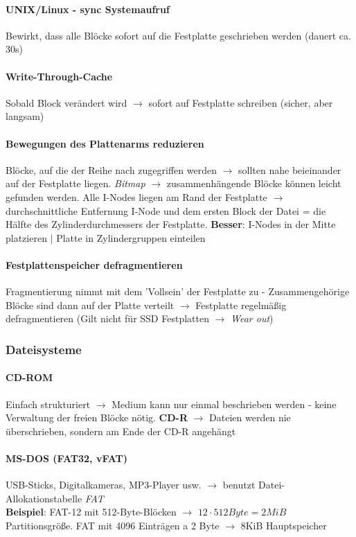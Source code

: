 \documentclass[11pt,a4paper,landscape]{article}
\begin{document}
\begin{multicols*}{3}
	\paragraph{UNIX/Linux - sync Systemaufruf} Bewirkt, dass alle Blöcke sofort auf die Festplatte geschrieben werden (dauert ca. 30s)
	\paragraph{Write-Through-Cache} Sobald Block verändert wird $\rightarrow$ sofort auf Festplatte schreiben (sicher, aber langsam)
	\paragraph{Bewegungen des Plattenarms reduzieren} Blöcke, auf die der Reihe nach zugegriffen werden $\rightarrow$ sollten nahe beieinander auf der Festplatte liegen. \textit{Bitmap} $\rightarrow$ zusammenhängende Blöcke können leicht gefunden werden. Alle I-Nodes liegen am Rand der Festplatte $\rightarrow$ durchschnittliche Entfernung I-Node und dem ersten Block der Datei = die Hälfte des Zylinderdurchmessers der Festplatte. \textbf{Besser}: I-Nodes in der Mitte platzieren $\vert$ Platte in Zylindergruppen einteilen
	\paragraph{Festplattenspeicher defragmentieren} Fragmentierung nimmt mit dem 'Vollsein' der Festplatte zu - Zusammengehörige Blöcke sind dann auf der Platte verteilt $\rightarrow$ Festplatte regelmäßig defragmentieren (Gilt nicht für SSD Festplatten $\rightarrow$ \textit{Wear out})
	\subsubsection{Dateisysteme}
	\paragraph{CD-ROM} Einfach strukturiert $\rightarrow$ Medium kann nur einmal beschrieben werden - keine Verwaltung der freien Blöcke nötig. \textbf{CD-R} $\rightarrow$ Dateien werden nie überschrieben, sondern am Ende der CD-R angehängt
	\paragraph{MS-DOS (FAT32, vFAT)} USB-Sticks, Digitalkameras, MP3-Player usw. $\rightarrow$ benutzt Datei-Allokationstabelle \textit{FAT}\\
	\textbf{Beispiel}: FAT-12 mit 512-Byte-Blöcken $\rightarrow$ $12 \cdot 512 Byte = 2MiB$ Partitionsgröße. FAT mit 4096 Einträgen a 2 Byte $\rightarrow$ 8KiB Hauptspeicher

\end{multicols*}
\end{document}
